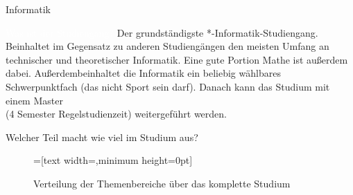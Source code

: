 
\begin{Huge}
    Informatik
\end{Huge}
\begin{exampleblock}{\textcolor{white}{Was ist der Studiengang?}}
    Der grundständigste *-Informatik-Studiengang. Beinhaltet im Gegensatz zu anderen Studiengängen den meisten Umfang an technischer und theoretischer Informatik. Eine gute Portion Mathe ist außerdem dabei. Außerdembeinhaltet die Informatik ein beliebig wählbares Schwerpunktfach (das nicht Sport sein darf). Danach kann das Studium mit einem Master \\ (4 Semester Regelstudienzeit) weitergeführt werden.
\end{exampleblock}	

\begin{block}{Welcher Teil macht wie viel im Studium aus?}
    \begin{figure}[h!]
        \begin{minipage}{\linewidth}
            \centering
            =[text width={},minimum height=0pt]
        \end{minipage}
        
        \caption{Verteilung der Themenbereiche über das komplette Studium}
    \end{figure}	
\end{block}%

